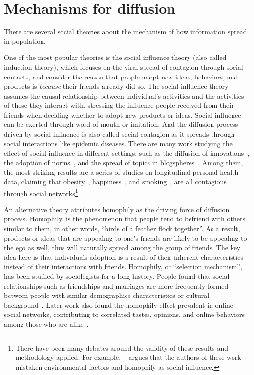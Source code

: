 \documentclass[phd,tocprelim]{cornell}
\begin{document}
\section{Mechanisms for diffusion}
There are several social theories about the mechanism of how information spread in population. 

One of the most popular theories is the social influence theory (also called induction theory), which focuses on the viral spread of contagion through social contacts, and consider the reason that people adopt new ideas, behaviors, and products is \emph{because} their friends already did so. The social influence theory assumes the causal relationship between individual's activities and the activities of those they interact with, stressing the influence people received from their friends when deciding whether to adopt new products or ideas. Social influence can be exerted through word-of-mouth or imitation. And the diffusion process driven by social influence is also called social contagion as it spreads through social interactions like epidemic diseases. There are many work studying the effect of social influence in different settings, such as the diffusion of innovations~\cite{strang-1998}, the adoption of norms~\cite{Axelrod-1986}, and the spread of topics in blogspheres~\cite{Java-2006}. Among them, the most striking results are a series of studies on longitudinal personal health data, claiming that obesity~\cite{Christakis-2007}, happiness~\cite{Fowler-2008}, and smoking~\cite{Christakis-2008}, are all contagious through social networks\footnote{There have been many debates around the validity of these results and methodology applied. For example, ~\cite{CohenCole-2008, Lyons-2010} argues that the authors of these work mistaken environmental factors and homophily as social influence.}. 

An alternative theory attributes homophily as the driving force of diffusion process. Homophily, is the phenomenon that people tend to befriend with others similar to them, in other words, ``birds of a feather flock together''. As a result, products or ideas that are appealing to one's friends are likely to be appealing to the ego as well, thus will naturally spread among the group of friends. The key idea here is that individuals adoption is a result of their inherent characteristics instead of their interactions with friends. Homophily, or ``selection mechanism'', has been studied by sociologists for a long history. People found that social relationships such as friendships and marriages are more frequently formed between people with similar demographics characteristics or cultural background~\cite{lazarsfeld-1954,mcpherson-2001}. Later work also found the homophily effect prevalent in online social networks, contributing to correlated tastes, opinions, and online behaviors among those who are alike~\cite{Liben-Nowell-2005,kossinets-2006,Kossinets-2009}.
\end{document}
